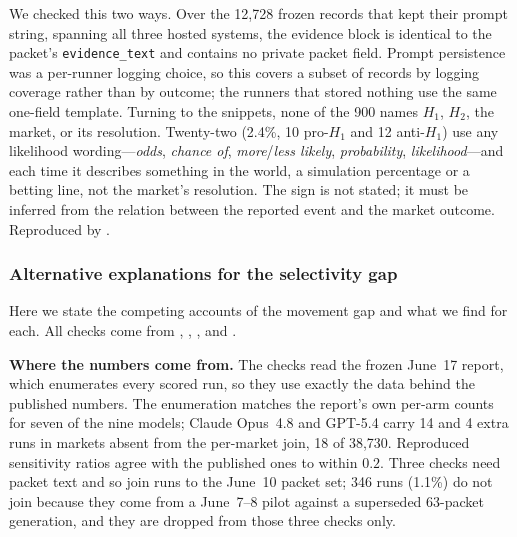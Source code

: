 We checked this two ways. Over the 12{,}728 frozen records that kept their prompt
string, spanning all three hosted systems, the evidence block is identical to the
packet's \texttt{evidence\_text} and contains no private packet field. Prompt
persistence was a per-runner logging choice, so this covers a subset of records by
logging coverage rather than by outcome; the runners that stored nothing use the
same one-field template. Turning to the snippets, none of the 900 names $H_1$,
$H_2$, the market, or its resolution. Twenty-two (2.4\%, 10 pro-$H_1$ and 12
anti-$H_1$) use any likelihood wording---\emph{odds}, \emph{chance of},
\emph{more}/\emph{less likely}, \emph{probability}, \emph{likelihood}---and each
time it describes something in the world, a simulation percentage or a betting
line, not the market's resolution. The sign is not stated; it must be inferred from the relation between the
reported event and the market outcome. Reproduced by
.

\subsubsection{Alternative explanations for the selectivity gap}
\label{app:exp1-alternatives}
Here we state the competing accounts of the movement gap and what we find for each.
All checks come from ,
, , and
.

\textbf{Where the numbers come from.} The checks read the frozen June~17 report,
which enumerates every scored run, so they use exactly the data behind the
published numbers. The enumeration matches the report's own per-arm counts for
seven of the nine models; Claude Opus~4.8 and GPT-5.4 carry 14 and 4 extra runs in
markets absent from the per-market join, 18 of 38{,}730. Reproduced sensitivity
ratios agree with the published ones to within $0.2$. Three checks need packet
text and so join runs to the June~10 packet set; 346 runs (1.1\%) do not join
because they come from a June~7--8 pilot against a superseded 63-packet
generation, and they are dropped from those three checks only.

